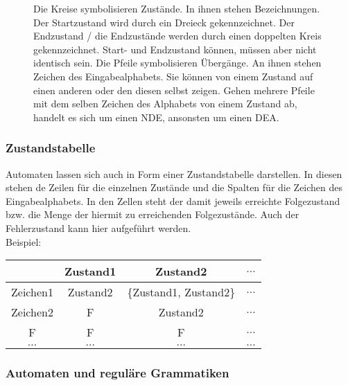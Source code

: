\documentclass{article}
\begin{document}
	\begin{figure}[H]
		\centering
		
		\caption{Die Kreise symbolisieren Zustände. In ihnen stehen Bezeichnungen. Der Startzustand wird durch ein Dreieck gekennzeichnet. Der  Endzustand / die Endzustände werden durch einen doppelten Kreis gekennzeichnet. Start- und Endzustand können, müssen aber nicht identisch sein. Die Pfeile symbolisieren Übergänge. An ihnen stehen Zeichen des Eingabealphabets. Sie können von einem Zustand auf einen anderen oder den diesen selbst zeigen. Gehen mehrere Pfeile mit dem selben Zeichen des Alphabets von einem Zustand ab, handelt es sich um einen NDE, ansonsten um einen DEA.}
	\end{figure}	
		
	\subsubsection{Zustandstabelle}
		
	Automaten lassen sich auch in Form einer Zustandstabelle darstellen. In diesen stehen de Zeilen für die einzelnen Zustände und die Spalten für die Zeichen des Eingabealphabets. In den Zellen steht der damit jeweils erreichte Folgezustand bzw. die Menge der hiermit zu erreichenden Folgezustände. Auch der Fehlerzustand kann hier aufgeführt werden.\\
	Beispiel:
		
	\begin{center}
		\begin{tabular}{ |c|c|c|c| } 
 			\hline
  			& Zustand1 & Zustand2 & $\ldots$ \\ 
  			\hline
 			Zeichen1 & Zustand2 & \{Zustand1, Zustand2\} & $\ldots$ \\ 
			\hline
 			Zeichen2 & F & Zustand2 & $\ldots$ \\ 
 			\hline
 			F & F & F & $\ldots$ \\
 			\hline
 			$\ldots$ & $\ldots$ & $\ldots$ & $\ldots$ \\
 			\hline
		\end{tabular}
	\end{center}
		
	\subsubsection{Automaten und reguläre Grammatiken}
		
\end{document}
